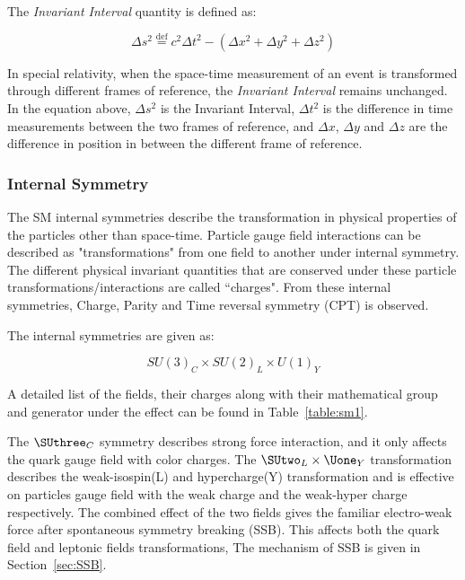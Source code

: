     The \textit{Invariant Interval} quantity is defined as:

    \begin{equation}
        \Delta s^2 \overset{\mathrm{def}}{=} c^{2}\Delta t^{2} - (\Delta x^{2}+\Delta y^{2} + \Delta z^{2})
        \label{eq:InvariantInterval}
    \end{equation}

    In special relativity, when the space-time measurement of an event is transformed through different frames of reference, the \textit{Invariant Interval} remains unchanged. In the equation above, $\Delta s^{2}$ is the Invariant Interval, $\Delta t^{2}$ is the difference in time measurements between the two frames of reference, and $\Delta x$, $\Delta y$ and $\Delta z$ are the difference in position in between the different frame of reference.

\subsubsection{Internal Symmetry}
The SM internal symmetries describe the transformation in physical properties of the particles other than space-time. Particle gauge field interactions can be described as "transformations" from one field to another under internal symmetry. The different physical invariant quantities that are conserved under these particle transformations/interactions are called ``charges". From these internal symmetries, Charge, Parity and Time reversal symmetry (CPT) is observed. 

The internal symmetries are given as:

\begin{equation}
    SU(3)_{C} \times SU(2)_{L} \times U(1)_{Y}
\end{equation}


    
    A detailed list of the fields, their charges along with their mathematical group and generator under the effect can be found in Table~\ref{table:sm1}.

    The $\SUthree_{C}$ symmetry describes strong force interaction, and it only affects the quark gauge field with color charges. The $\SUtwo_{L} \times \Uone_{Y}$ transformation describes the weak-isospin(L) and hypercharge(Y) transformation and is effective on particles gauge field with the weak charge and the weak-hyper charge respectively. The combined effect of the two fields gives the familiar electro-weak force after spontaneous symmetry breaking (SSB). This affects both the quark field and leptonic fields transformations, The mechanism of SSB is given in Section~\ref{sec:SSB}.


